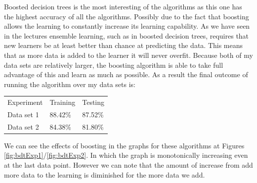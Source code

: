 \documentclass[
	letterpaper, %
]{IEEEtran}
\begin{document}
		Boosted decision trees is the most interesting of the algorithms as this one has the highest accuracy of all the algorithms. Possibly due to the fact that boosting allows the learning to constantly increase its learning capability. As we have seen in the lectures ensemble learning, such as in boosted decision trees, requires that new learners be at least better than chance at predicting the data. This means that as more data is added to the learner it will never overfit. Because both of my data sets are relatively larger, the boosting algorithm is able to take full advantage of this and learn as much as possible. As a result the final outcome of running the algorithm over my data sets is:
		\begin{center}
			\begin{table}[h]
				\begin{tabular}{lll}
					Experiment & Training & Testing \\
					Data set 1 & 88.42\% & 87.52\% \\
					Data set 2 & 84.38\% & 81.80\%
				\end{tabular}
			\end{table}
		\end{center}
		We can see the effects of boosting in the graphs for these algorithms at Figures \ref{fig:bdtExp1}/\ref{fig:bdtExp2}. In which the graph is monotonically increasing even at the last data point. However we can note that the amount of increase from add more data to the learning is diminished for the more data we add.
\end{document}
